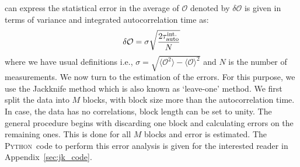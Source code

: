 \documentclass[letter,11pt]{article}
\newcommand{\PY}{\textsc{Python}}
\begin{document}
can express the statistical error in the average of $\mathcal{O}$ denoted 
by $\delta \mathcal{O}$ is given in terms of variance and integrated autocorrelation time as:
\begin{equation}
	\delta \mathcal{O} = \sigma \sqrt{\frac{2 \tau_{\rm{auto}}^{\rm{int.}}}{N}}
\end{equation}
where we have usual definitions i.e., 
$\sigma = \sqrt{\langle \mathcal{O}^2\rangle - \langle \mathcal{O}\rangle^{2}}$ and $N$ is the number of measurements. We now turn to the estimation of the errors. For this purpose, we use the Jackknife method which is also known as `leave-one' method. We first split the data into $M$ blocks, with block size more than the autocorrelation time. In case, the data has no correlations, block length can be set to unity. The general procedure begins with discarding one block and calculating errors on the remaining ones. This is done for all $M$ blocks and error is estimated. The \PY~code to perform this error analysis is given for the interested reader in Appendix~\ref{sec:jk_code}. 

\end{document}
